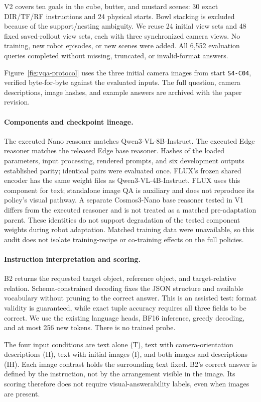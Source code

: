 \documentclass{article}
\begin{document}
V2 covers ten goals in the cube, butter, and mustard scenes: 30 exact DIR/TF/RF instructions and 24 physical starts. Bowl stacking is excluded because of the support/nesting ambiguity. We reuse 24 initial view sets and 48 fixed saved-rollout view sets, each with three synchronized camera views. No training, new robot episodes, or new scenes were added. All 6,552 evaluation queries completed without missing, truncated, or invalid-format answers.

Figure~\ref{fig:vqa-protocol} uses the three initial camera images from start \texttt{S4-C04}, verified byte-for-byte against the evaluated inputs. The full question, camera descriptions, image hashes, and example answers are archived with the paper revision.

\paragraph{Components and checkpoint lineage.}
The executed Nano reasoner matches Qwen3-VL-8B-Instruct. The executed Edge reasoner matches the released Edge base reasoner. Hashes of the loaded parameters, input processing, rendered prompts, and six development outputs established parity; identical pairs were evaluated once. FLUX's frozen shared encoder has the same weight files as Qwen3-VL-4B-Instruct. FLUX uses this component for text; standalone image QA is auxiliary and does not reproduce its policy's visual pathway. A separate Cosmos3-Nano base reasoner tested in V1 differs from the executed reasoner and is not treated as a matched pre-adaptation parent. These identities do not support degradation of the tested component weights during robot adaptation. Matched training data were unavailable, so this audit does not isolate training-recipe or co-training effects on the full policies.

\paragraph{Instruction interpretation and scoring.}
B2 returns the requested target object, reference object, and target-relative relation. Schema-constrained decoding fixes the JSON structure and available vocabulary without pruning to the correct answer. This is an assisted test: format validity is guaranteed, while exact tuple accuracy requires all three fields to be correct. We use the existing language heads, BF16 inference, greedy decoding, and at most 256 new tokens. There is no trained probe.

The four input conditions are text alone (T), text with camera-orientation descriptions (H), text with initial images (I), and both images and descriptions (IH). Each image contrast holds the surrounding text fixed. B2's correct answer is defined by the instruction, not by the arrangement visible in the image. Its scoring therefore does not require visual-answerability labels, even when images are present.
\end{document}
